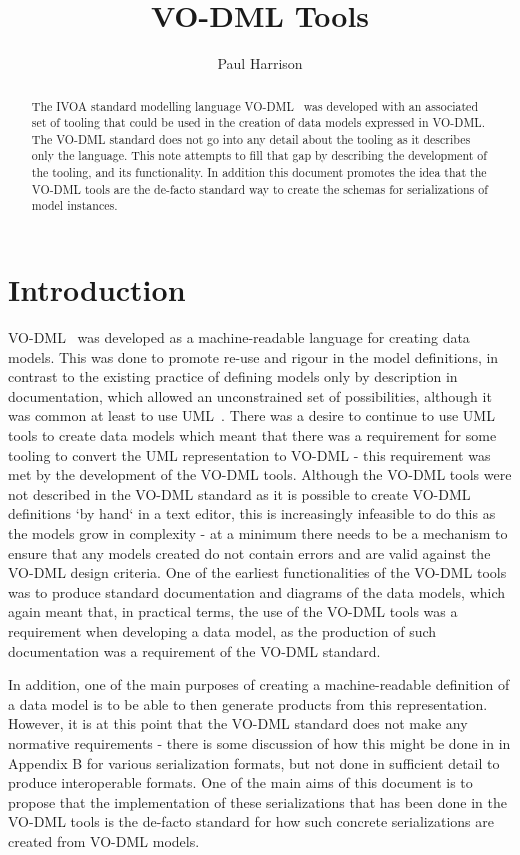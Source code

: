 \documentclass[11pt,a4paper]{ivoa}
\title{VO-DML Tools}
\author[https://www.ivoa.net/cgi-bin/twiki/bin/view/IVOA/PaulHarrison]{Paul Harrison}
\begin{document}
\begin{abstract}
    The IVOA standard modelling language VO-DML~\cite{2018ivoa.spec.0910L} was developed
    with an associated set of tooling that could be used in the creation of data models
    expressed in VO-DML. The VO-DML standard does not go into any detail about the tooling
    as it describes only the language.
    This note attempts to fill that gap by describing the
    development of the tooling, and its functionality.
    In addition this document promotes the idea that the VO-DML tools are the de-facto standard way to create the
    schemas for serializations of model instances.
\end{abstract}



\section{Introduction}

VO-DML~\cite{2018ivoa.spec.0910L} was developed as a machine-readable language for creating data models.
This was done to promote re-use and rigour in the model definitions, in contrast to the existing practice of
defining models only by description in documentation, which allowed an unconstrained set of possibilities, although
it was common at least to use UML~\cite{std:uml}.
There was a desire to continue to use UML tools to create data models which meant that there was a requirement for
some tooling to convert the UML representation to VO-DML - this requirement was met by the development of the VO-DML tools.
Although the VO-DML tools were not described in the VO-DML standard as it is possible to create VO-DML definitions `by hand` in a text editor,
this is increasingly infeasible to do this as the models grow in complexity - at a minimum there needs to be a mechanism to
ensure that any models created do not contain errors and are valid against the VO-DML design criteria.
One of the earliest functionalities of the VO-DML tools was to produce standard documentation and diagrams of the data models,
which again meant that, in practical terms, the use of the VO-DML tools was a requirement when developing a data model, as
the production of such documentation was a requirement of the VO-DML standard.

In addition, one of the main purposes of creating a machine-readable definition of a data model is to be able to
then generate products from this representation.
However, it is at this point that the VO-DML standard does not make any normative requirements - there is some discussion of how this might be done in
in Appendix B for various serialization formats, but not done in sufficient detail to produce interoperable formats.
One of the main aims of this document is to propose that the implementation of these serializations that has been done in the VO-DML
tools is the de-facto standard for how such concrete serializations are created from VO-DML models.
\end{document}
